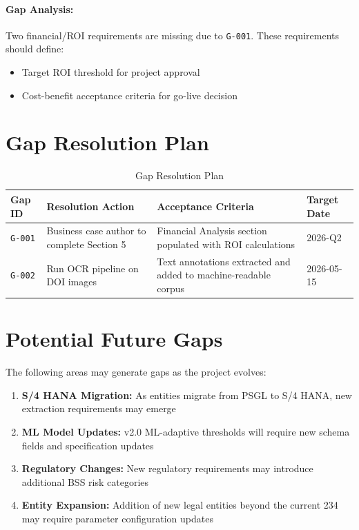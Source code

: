 \documentclass[11pt,a4paper,twoside]{report}
\newcommand{\gapref}[1]{\texttt{#1}}
\begin{document}
\paragraph{Gap Analysis:} Two financial/ROI requirements are missing due to
\gapref{G-001}. These requirements should define:
\begin{itemize}[noitemsep]
\item Target ROI threshold for project approval
\item Cost-benefit acceptance criteria for go-live decision
\end{itemize}

\section{Gap Resolution Plan}
\label{sec:gap-resolution}

\begin{table}[h]
\centering
\caption{Gap Resolution Plan}
\label{tab:gap-resolution-plan}
\begin{tabularx}{\textwidth}{@{}C{1.5cm}L{4cm}L{4.5cm}C{2.5cm}@{}}
\toprule
\textbf{Gap ID} & \textbf{Resolution Action} & \textbf{Acceptance Criteria} & \textbf{Target Date} \\
\midrule
\gapref{G-001} & Business case author to complete Section 5 & Financial Analysis section populated with ROI calculations & 2026-Q2 \\
\gapref{G-002} & Run OCR pipeline on DOI images & Text annotations extracted and added to machine-readable corpus & 2026-05-15 \\
\bottomrule
\end{tabularx}
\end{table}

\section{Potential Future Gaps}
\label{sec:future-gaps}

The following areas may generate gaps as the project evolves:

\begin{enumerate}
\item \textbf{S/4 HANA Migration:} As entities migrate from PSGL to S/4 HANA,
new extraction requirements may emerge
\item \textbf{ML Model Updates:} v2.0 ML-adaptive thresholds will require
new schema fields and specification updates
\item \textbf{Regulatory Changes:} New regulatory requirements may introduce
additional BSS risk categories
\item \textbf{Entity Expansion:} Addition of new legal entities beyond the
current 234 may require parameter configuration updates
\end{enumerate}
\end{document}
